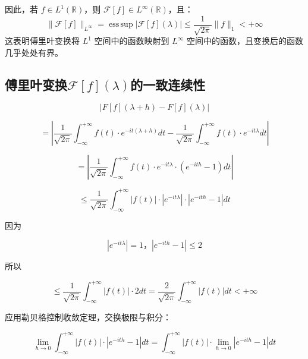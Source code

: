 \documentclass[12pt,a4paper]{article}
\theoremstyle{plain}
\theoremstyle{definition}
\theoremstyle{remark}
\begin{document}
	因此，若 $f \in L^1(\mathbb{R})$，则 $\mathcal{F}[f] \in L^\infty(\mathbb{R})$，且：
	\[
	\|\mathcal{F}[f]\|_{L^\infty} = \operatorname{ess\,sup} |\mathcal{F}[f](\lambda)| \leq \frac{1}{\sqrt{2\pi}} \|f\|_1 < +\infty
	\]
	这表明傅里叶变换将 $L^1$ 空间中的函数映射到 $L^\infty$ 空间中的函数，且变换后的函数几乎处处有界。
	
	\subsection{傅里叶变换\(\mathcal{F}[f](\lambda)\)的一致连续性}
	
	
	\[
	|F[f](\lambda + h) - F[f](\lambda)|
	\]
	
	\[
	= \left| \frac{1}{\sqrt{2\pi}} \int_{-\infty}^{+\infty} f(t) \cdot e^{-it(\lambda + h)} dt - \frac{1}{\sqrt{2\pi}} \int_{-\infty}^{+\infty} f(t) \cdot e^{-it\lambda} dt \right|
	\]
	
	\[
	= \left| \frac{1}{\sqrt{2\pi}} \int_{-\infty}^{+\infty} f(t) \cdot e^{-it\lambda} \cdot (e^{-ith} - 1) dt \right|
	\]
	
	\[
	\leq \frac{1}{\sqrt{2\pi}} \int_{-\infty}^{+\infty} |f(t)| \cdot |e^{-it\lambda}| \cdot |e^{-ith} - 1| dt
	\]
	
	因为
	
	\[
	|e^{-it\lambda}| = 1，	|e^{-ith} - 1| \leq 2
	\]
	
	所以
	
	\[
	\leq \frac{1}{\sqrt{2\pi}} \int_{-\infty}^{+\infty} |f(t)| \cdot 2 dt = \frac{2}{\sqrt{2\pi}} \int_{-\infty}^{+\infty} |f(t)| dt < +\infty
	\]
	
	应用勒贝格控制收敛定理，交换极限与积分：
	
	\[
	\lim_{h \to 0} \int_{-\infty}^{+\infty} |f(t)| \cdot |e^{-ith} - 1| dt = \int_{-\infty}^{+\infty} |f(t)| \cdot \lim_{h \to 0} |e^{-ith} - 1| dt
	\]
\end{document}
